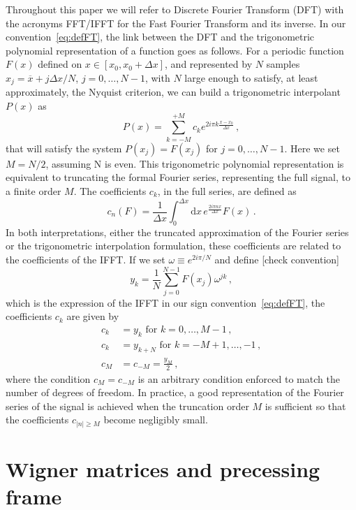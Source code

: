 \documentclass[aps,showpacs,twocolumn,
prd,superscriptaddress,nofootinbib]{revtex4-1}
\newcommand{\be}{\begin{equation}}
\newcommand{\ee}{\end{equation}}
\newcommand\ud{{\mathrm{d}}}
\newcommand{\ov}[1]{\overline{#1}}
\newcommand{\nn}{\nonumber}
\newcommand{\SM}[1]{{\color{Red} #1}}
\begin{document}
Throughout this paper we will refer to Discrete Fourier Transform (DFT) with the acronyms FFT/IFFT for the Fast Fourier Transform and its inverse. In our convention~\eqref{eq:defFT}, the link between the DFT and the trigonometric polynomial representation of a function goes as follows. For a periodic function $F(x)$ defined on $x\in [x_{0}, x_{0} + \Delta x]$, and represented by $N$ samples $x_{j} = \ov{x} + j \Delta x/N$, $j=0,\dots,N-1$, with $N$ large enough to satisfy, at least approximately, the Nyquist criterion, we can build a trigonometric interpolant $P(x)$ as
\be
	P(x) = \sum\limits_{k=-M}^{+M} c_{k} e^{2i\pi k \frac{x-x_{0}}{\Delta x}} \,,
\ee
that will satisfy the system $P(x_{j}) = F(x_{j})$ for $j=0,\dots, N-1$. Here we set $M=N/2$, assuming N is even. This trigonometric polynomial representation is equivalent to truncating the formal Fourier series, representing the full signal, to a finite order $M$. The coefficients $c_{k}$, in the full series, are defined as
\be\label{eq:defcnApp}
	c_{n}(F) = \frac{1}{\Delta x} \int_{0}^{\Delta x} \ud x \, e^{\frac{2 i \pi n x }{ \Delta x}} F(x) \,.
\ee
In both interpretations, either the truncated approximation of the Fourier series or  the trigonometric interpolation formulation, these coefficients are related to the coefficients of the IFFT. If we set $\omega \equiv e^{2i\pi/N}$ and define \SM{[check convention]}
\be\label{eq:ykDFT}
	y_{k} = \frac{1}{N} \sum\limits_{j=0}^{N-1} F(x_{j}) \omega^{jk} \,,
\ee
which is the expression of the IFFT in our sign convention~\eqref{eq:defFT}, the coefficients $c_{k}$ are given by
\begin{align}\label{eq:ckyk}
	c_{k} &= y_{k} \text{ for } k=0,\dots, M-1 \,, \nn\\
	c_{k} &= y_{k+N} \text{ for } k=-M+1,\dots, -1 \,, \nn\\
	c_{M} &= c_{-M} = \frac{y_{M}}{2} \,,
\end{align}
where the condition $c_{M} = c_{-M}$ is an arbitrary condition enforced to match the number of degrees of freedom. In practice, a good representation of the Fourier series of the signal is achieved when the truncation order $M$ is sufficient so that the coefficients $c_{|n|\geq M}$ become negligibly small.


\section{Wigner matrices and precessing frame}
\label{app:wigner}
\end{document}
